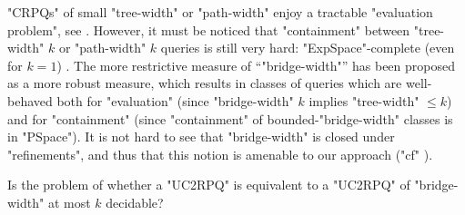 "CRPQs" of small "tree-width" or "path-width" enjoy a tractable "evaluation problem", see . However, it must be noticed that "containment" between "tree-width" $k$ or "path-width" $k$ queries is still very hard: "ExpSpace"-complete (even for $k=1$) \cite{CalvaneseDeGiacomoLenzeriniVardi2000Containment}. The more restrictive measure of ``"bridge-width"'' \cite{Figueira2020Containment} has been proposed as a more robust measure, which results in classes of queries which are well-behaved both for "evaluation" (since "bridge-width" $k$ implies "tree-width" $\leq k$) and for "containment" (since "containment" of bounded-"bridge-width" classes is in "PSpace").
It is not hard to see that "bridge-width" is closed under "refinements", and thus that this notion is amenable to our approach ("cf" ).
\begin{question}
    \AP\label{qu:semantic-bridge-width}
    Is the problem of whether a "UC2RPQ" is equivalent to a "UC2RPQ" of "bridge-width" at most $k$ decidable?
\end{question}